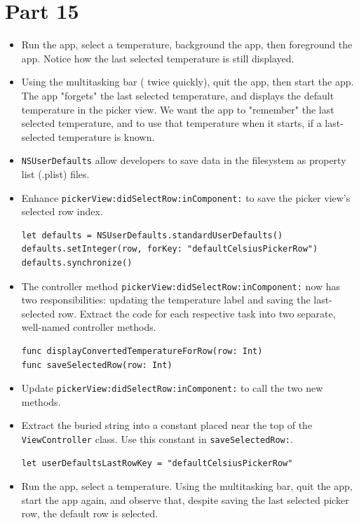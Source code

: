 \documentclass[a4paper,11pt]{scrartcl}
\begin{document}
\section*{Part 15}

\begin{itemize}
\item Run the app, select a temperature, background the app, then foreground the app. Notice how the last selected temperature is still displayed.
\item Using the multitasking bar ( twice quickly), quit the app, then start the app. The app "forgets" the last selected temperature, and displays the default temperature in the picker view. We want the app to "remember" the last selected temperature, and to use that temperature when it starts, if a last-selected temperature is known.
\item \texttt{NSUserDefaults} allow developers to save data in the filesystem as property list (.plist) files.
\item Enhance \texttt{pickerView:didSelectRow:inComponent:} to save the picker view's selected row index.
\begin{lstlisting}
let defaults = NSUserDefaults.standardUserDefaults()
defaults.setInteger(row, forKey: "defaultCelsiusPickerRow")
defaults.synchronize()
\end{lstlisting}
\item The controller method \texttt{pickerView:didSelectRow:inComponent:} now has two responsibilities: updating the temperature label and saving the last-selected row. Extract the code for each respective task into two separate, well-named controller methods.
\begin{lstlisting}
func displayConvertedTemperatureForRow(row: Int)
func saveSelectedRow(row: Int)
\end{lstlisting}
\item Update \texttt{pickerView:didSelectRow:inComponent:} to call the two new methods.
\item Extract the buried string into a constant placed near the top of the \texttt{ViewController} class. Use this constant in \texttt{saveSelectedRow:}.
\begin{lstlisting}
let userDefaultsLastRowKey = "defaultCelsiusPickerRow"
\end{lstlisting}
\item Run the app, select a temperature. Using the multitasking bar, quit the app, start the app again, and observe that, despite saving the last selected picker row, the default row is selected.
\end{itemize}
\end{document}
